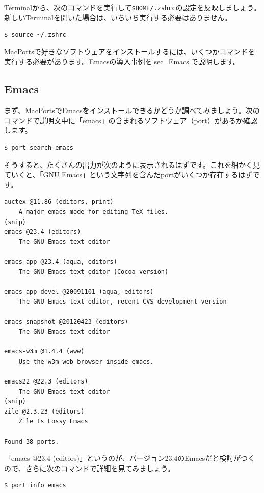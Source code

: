 Terminalから、次のコマンドを実行して\texttt{\$HOME/.zshrc}の設定を反映しましょう。新しいTerminalを開いた場合は、いちいち実行する必要はありません。

\begin{lstlisting}[language=bash]
$ source ~/.zshrc
\end{lstlisting}

MacPortsで好きなソフトウェアをインストールするには、いくつかコマンドを実行する必要があります。Emacsの導入事例を\ref{sec_Emacs}で説明します。

\subsection{Emacs}

まず、MacPortsでEmacsをインストールできるかどうか調べてみましょう。次のコマンドで説明文中に「emacs」の含まれるソフトウェア（port）があるか確認します。

\begin{lstlisting}[language=bash]
$ port search emacs
\end{lstlisting}

そうすると、たくさんの出力が次のように表示されるはずです。これを細かく見ていくと、「GNU Emacs」という文字列を含んだportがいくつか存在するはずです。

\begin{lstlisting}
auctex @11.86 (editors, print)
    A major emacs mode for editing TeX files.
(snip)
emacs @23.4 (editors)
    The GNU Emacs text editor

emacs-app @23.4 (aqua, editors)
    The GNU Emacs text editor (Cocoa version)

emacs-app-devel @20091101 (aqua, editors)
    The GNU Emacs text editor, recent CVS development version

emacs-snapshot @20120423 (editors)
    The GNU Emacs text editor

emacs-w3m @1.4.4 (www)
    Use the w3m web browser inside emacs.

emacs22 @22.3 (editors)
    The GNU Emacs text editor
(snip)
zile @2.3.23 (editors)
    Zile Is Lossy Emacs

Found 38 ports.
\end{lstlisting}

「emacs @23.4 (editors)」というのが、バージョン23.4のEmacsだと検討がつくので、さらに次のコマンドで詳細を見てみましょう。

\begin{lstlisting}[language=bash]
$ port info emacs
\end{lstlisting}

